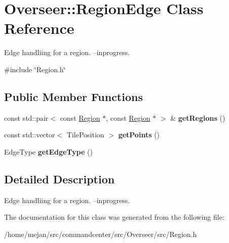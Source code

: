 \hypertarget{classOverseer_1_1RegionEdge}{}\section{Overseer\+:\+:Region\+Edge Class Reference}
\label{classOverseer_1_1RegionEdge}


Edge handliing for a region. --inprogress.  




{\ttfamily \#include \char`\"{}Region.\+h\char`\"{}}

\subsection*{Public Member Functions}
\begin{DoxyCompactItemize}
\item 
const std\+::pair$<$ const \hyperlink{classOverseer_1_1Region}{Region} $\ast$, const \hyperlink{classOverseer_1_1Region}{Region} $\ast$ $>$ \& {\bfseries get\+Regions} ()\hypertarget{classOverseer_1_1RegionEdge_ac4df47c0027b8d5fcc1de39ba53741d9}{}\label{classOverseer_1_1RegionEdge_ac4df47c0027b8d5fcc1de39ba53741d9}

\item 
const std\+::vector$<$ Tile\+Position $>$ {\bfseries get\+Points} ()\hypertarget{classOverseer_1_1RegionEdge_abdc39850cd5c84600e72d0ad557aaf44}{}\label{classOverseer_1_1RegionEdge_abdc39850cd5c84600e72d0ad557aaf44}

\item 
Edge\+Type {\bfseries get\+Edge\+Type} ()\hypertarget{classOverseer_1_1RegionEdge_ae10890eae894662fb70d394f4706ea96}{}\label{classOverseer_1_1RegionEdge_ae10890eae894662fb70d394f4706ea96}

\end{DoxyCompactItemize}


\subsection{Detailed Description}
Edge handliing for a region. --inprogress. 

The documentation for this class was generated from the following file\+:\begin{DoxyCompactItemize}
\item 
/home/mejan/src/commandcenter/src/\+Overseer/src/Region.\+h\end{DoxyCompactItemize}
